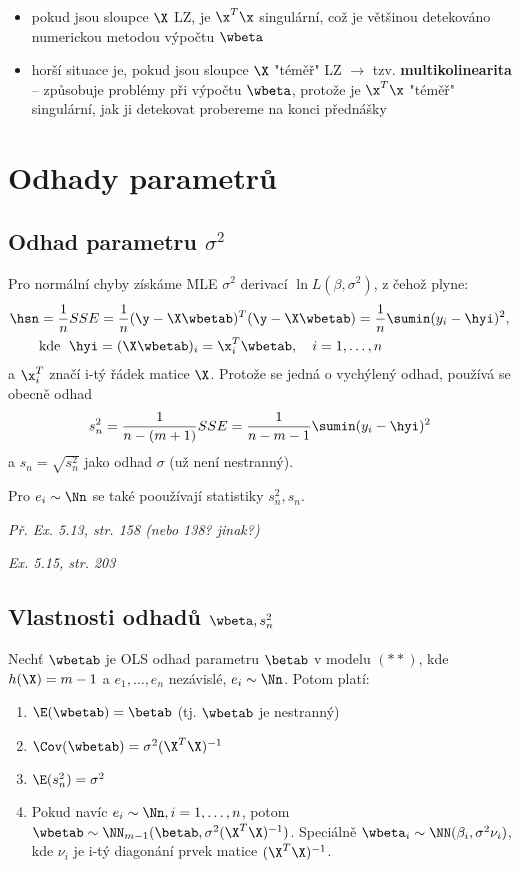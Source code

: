 \begin{remark}
	\begin{itemize}
		\item pokud jsou sloupce $\X$ LZ, je $\x^T\x$ singulární, což je většinou detekováno numerickou metodou výpočtu $\wbeta$
		\item horší situace je, pokud jsou sloupce $\X$ "téměř" LZ $\rightarrow$ tzv. \textbf{multikolinearita} -- způsobuje problémy při výpočtu $\wbeta$, protože je $\x^T\x$ "téměř" singulární, jak ji detekovat probereme na konci přednášky
	\end{itemize}
\end{remark}

\section{Odhady parametrů}
\subsection{Odhad parametru $\sigma^2$}
Pro normální chyby získáme MLE $\sigma^2$ derivací $\ln L(\beta, \sigma^2)$, z čehož plyne:
\begin{align*}
	\hsn & = \frac{1}{n} SSE = \frac{1}{n}(\y - \X \wbetab)^T(\y - \X \wbetab) = \frac{1}{n} \sumin(y_i - \hyi)^2, \\
	& \text{kde \;} \hyi = (\X \wbetab)_i = \x_i^T \wbetab, \quad i = 1, \dots, n \\
\end{align*}
a $\x_i^T$ značí i-tý řádek matice $\X$. Protože se jedná o vychýlený odhad, používá se obecně odhad
$$
	s_n^2 = \frac{1}{n-(m+1)} SSE = \frac{1}{n - m - 1} \sumin(y_i - \hyi)^2
$$
a $s_n = \sqrt{s_n^2}$ jako odhad $\sigma$ (už není nestranný).

Pro $e_i \sim \Nn$ se také pooužívají statistiky $s_n^2, s_n$.

\textit{Př. Ex. 5.13, str. 158 (nebo 138? jinak?)}

\textit{Ex. 5.15, str. 203}

\subsection{Vlastnosti odhadů $\wbeta, s_n^2$}
\begin{theorem}
	Nechť $\wbetab$ je OLS odhad parametru $\betab$ v modelu $(**)$, kde $h(\X) = m-1$ a $e_1, \dots, e_n$ nezávislé, $e_i \sim \Nn$. Potom platí:
	\begin{enumerate}
		\item $\E(\wbetab) = \betab$ (tj. $\wbetab$ je nestranný)
		\item $\Cov(\wbetab) = \sigma^2 (\X^T \X)^{-1}$
		\item $\E(s_n^2) = \sigma^2$
		\item Pokud navíc $e_i \sim \Nn, i = 1, \dots, n$, potom $\wbetab \sim \NN_{m-1}(\betab, \sigma^2(\X^T \X)^{-1})$. Speciálně $\wbeta_i \sim \NN(\beta_i, \sigma^2 \nu_i)$, kde $\nu_i$ je i-tý diagonání prvek matice $(\X^T \X)^{-1}$.
	\end{enumerate}
\end{theorem}

